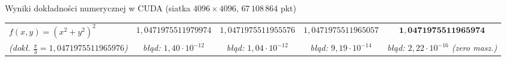 \documentclass[aspectratio=169, 10pt, xcolor={table}]{beamer}
\begin{document}
\begin{frame}{Wyniki dokładności numerycznej w CUDA (siatka $4096 \times 4096$, $67\,108\,864$ pkt)}
\begin{table}
\begin{tabular}{@{} l c c c c @{}}
      \midrule
      $f(x,y) = (x^2+y^2)^2$ & $1{,}0471975511979974$ & $1{,}0471975511955576$ & $1{,}0471975511965057$ & \cellcolor{RowHighlight}$\mathbf{1{,}0471975511965974}$ \\
      \textit{\scriptsize (dokł. $\frac{\pi}{3} = 1{,}0471975511965976$)} & \textit{\scriptsize błąd: $1{,}40 \cdot 10^{-12}$} & \textit{\scriptsize błąd: $1{,}04 \cdot 10^{-12}$} & \textit{\scriptsize błąd: $9{,}19 \cdot 10^{-14}$} & \cellcolor{RowHighlight}\textit{\scriptsize błąd: $2{,}22 \cdot 10^{-16}$ (zero masz.)} \\
      \bottomrule
    \end{tabular}
  \end{table}
\end{frame}

\end{document}
